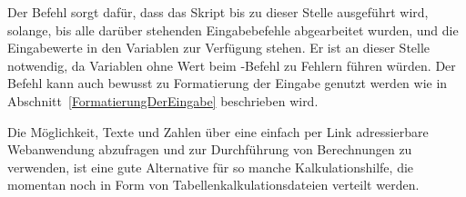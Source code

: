 Der Befehl  sorgt dafür, dass das Skript bis zu dieser Stelle ausgeführt wird, solange, bis alle darüber stehenden Eingabebefehle abgearbeitet wurden, und die Eingabewerte in den Variablen zur Verfügung stehen. Er ist an dieser Stelle notwendig, da Variablen ohne Wert beim -Befehl zu Fehlern führen würden. Der Befehl kann auch bewusst zu Formatierung der Eingabe genutzt werden wie in Abschnitt~\ref{FormatierungDerEingabe} beschrieben wird.

Die Möglichkeit, Texte und Zahlen über eine einfach per Link adressierbare Webanwendung abzufragen und zur Durchführung von Berechnungen zu verwenden, ist eine gute Alternative für so manche Kalkulationshilfe, die momentan noch in Form von Tabellenkalkulationsdateien verteilt werden.

